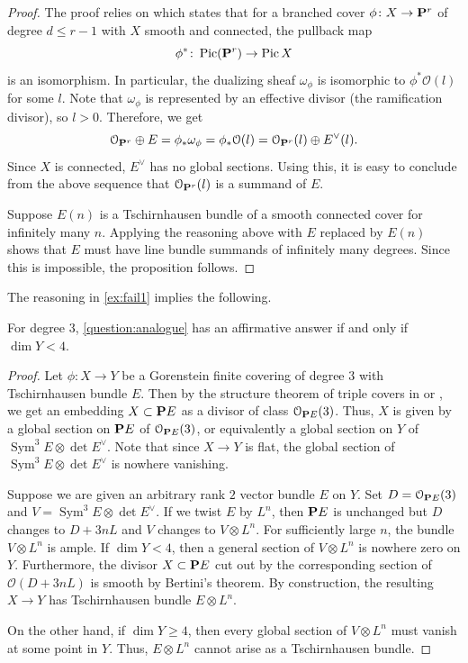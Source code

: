 \documentclass[11 pt]{amsart}
\renewcommand{\O}{{\mathcal O}}
\renewcommand {\P}{{\bf P}}
\providecommand {\from}{{\colon}}
\providecommand{\Pic}{\operatorname{Pic}}
\providecommand{\Sym}{\operatorname{Sym}}
\numberwithin{equation}{section}
\begin{document}
\begin{proof}
  The proof relies on \cite[Proposition~3.1]{laz:80} which states that for a branched cover $\phi \from X \to \P^{r}$ of degree $d \leq r-1$ with $X$ smooth and connected, the pullback map
  \[\phi^{*} \from \Pic(\P^{r}) \to \Pic X\]
  is an isomorphism. 
  In particular, the dualizing sheaf $\omega_\phi$ is isomorphic to $\phi^* \O(l)$ for some $l$.
  Note that $\omega_\phi$ is represented by an effective divisor (the ramification divisor), so $ l > 0$.  
  Therefore, we get 
  \[ \O_{\P^r} \oplus E = \phi_* \omega_\phi = \phi_* \O(l) = \O_{\P^r}(l) \oplus E^\vee(l).\]
  Since $X$ is connected, $E^\vee$ has no global sections.
  Using this, it is easy to conclude from the above sequence that $\O_{\P^r}(l)$ is a summand of $E$.
  
  Suppose $E(n)$ is a Tschirnhausen bundle of a smooth connected cover for infinitely many $n$.
  Applying the reasoning above with $E$ replaced by $E(n)$ shows that $E$ must have line bundle summands of infinitely many degrees.
  Since this is impossible, the proposition follows.
\end{proof}

The reasoning in \autoref{ex:fail1} implies the following.
\begin{proposition}
  For degree 3, \autoref{question:analogue} has an affirmative answer if and only if $\dim Y < 4$.
\end{proposition}
\begin{proof}
  Let $\phi \from X \to Y$ be a Gorenstein finite covering of degree 3 with Tschirnhausen bundle $E$.
  Then by the structure theorem of triple covers in \cite{mir:85} or \cite{cas.eke:96}, we get an embedding $X \subset \P E$ as a divisor of class $\O_{\P E}(3)$.
  Thus, $X$ is given by a global section on $\P E$ of $\O_{\P E}(3)$, or equivalently a global section on $Y$ of $\Sym^3 E \otimes \det E^\vee$.
  Note that since $X \to Y$ is flat, the global section of $\Sym^3 E \otimes \det E^\vee$ is nowhere vanishing.
  
  Suppose we are given an arbitrary rank $2$ vector bundle $E$ on $Y$.
  Set $D = \O_{\P E}(3)$ and $V = \Sym^3 E \otimes \det E^\vee$.
  If we twist $E$ by $L^n$, then  $\P E$ is unchanged but $D$ changes to $D + 3nL$ and $V$ changes to $V \otimes L^n$.
  For sufficiently large $n$, the bundle $V \otimes L^n$ is ample.
  If $\dim Y < 4$, then a general section of $V \otimes L^n$ is nowhere zero on $Y$.
  Furthermore, the divisor $X \subset \P E$ cut out by the corresponding section of $\O(D+3nL)$ is smooth by Bertini's theorem.
  By construction, the resulting $X \to Y$ has Tschirnhausen bundle $E \otimes L^n$.
  
  On the other hand, if $\dim Y \geq 4$, then every global section of $V \otimes L^n$ must vanish at some point in $Y$.
  Thus, $E \otimes L^n$ cannot arise as a Tschirnhausen bundle.
\end{proof}
\end{document}
